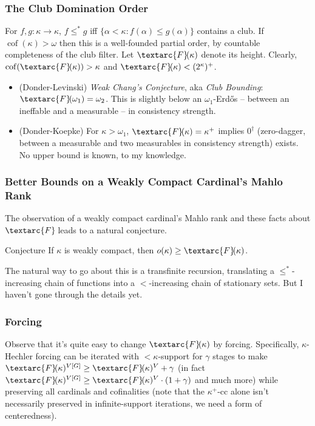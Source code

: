 \documentclass{beamer}
\newcommand{\cof}{\operatorname{cof}}
\newcommand{\fehu}{\textarc{F}\!}
\begin{document}
\begin{frame}
\frametitle{The Club Domination Order}
For $f, g: \kappa \to \kappa$, $f \leq^* g$ iff $\{\alpha < \kappa: f(\alpha) \leq g(\alpha)\}$ contains a club. If $\cof(\kappa) > \omega$ then this is a well-founded partial order, by countable completeness of the club filter. Let $\fehu(\kappa)$ denote its height. Clearly, $\cof(\fehu(\kappa)) > \kappa$ and $\fehu(\kappa) < (2^\kappa)^+$. \pause

\begin{itemize}
\item (Donder-Levinski) \textit{Weak Chang's Conjecture}, aka \textit{Club Bounding}: $\fehu(\omega_1) = \omega_2$. This is slightly below an $\omega_1$-Erdős -- between an ineffable and a measurable -- in consistency strength.
\item (Donder-Koepke) For $\kappa > \omega_1$, $\fehu(\kappa) = \kappa^+$ implies $0^\dagger$ (zero-dagger, between a measurable and two measurables in consistency strength) exists. No upper bound is known, to my knowledge.
\end{itemize}
\end{frame}

\begin{frame}
\frametitle{Better Bounds on a Weakly Compact Cardinal's Mahlo Rank}
The observation of a weakly compact cardinal's Mahlo rank and these facts about $\fehu$ leads to a natural conjecture.

\begin{block}{Conjecture}
If $\kappa$ is weakly compact, then $o(\kappa) \geq \fehu(\kappa)$.
\end{block}

The natural way to go about this is a transfinite recursion, translating a $\leq^*$-increasing chain of functions into a $<$-increasing chain of stationary sets. But I haven't gone through the details yet.
\end{frame}

\begin{frame}
\frametitle{Forcing}
Observe that it's quite easy to change $\fehu(\kappa)$ by forcing. Specifically, $\kappa$-Hechler forcing can be iterated with $< \kappa$-support for $\gamma$ stages to make $\fehu(\kappa)^{V[G]} \geq \fehu(\kappa)^V + \gamma$ (in fact $\fehu(\kappa)^{V[G]} \geq \fehu(\kappa)^V \cdot (1 + \gamma)$ and much more) while preserving all cardinals and cofinalities (note that the $\kappa^+$-cc alone isn't necessarily preserved in infinite-support iterations, we need a form of centeredness).
\end{frame}
\end{document}
